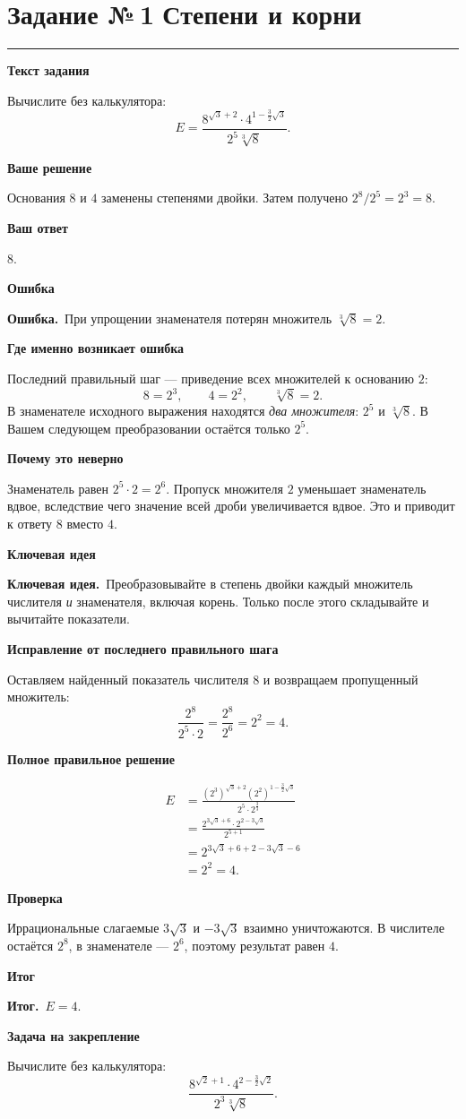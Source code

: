 \documentclass[a4paper,12pt]{article}
\newcommand{\reviewlabel}[1]{\par\smallskip\textbf{\color{accent}#1}\par\nobreak}
\newcommand{\errortext}{\textbf{\color{error}Ошибка.}\ }
\newcommand{\ideatext}{\textbf{\color{hint}Ключевая идея.}\ }
\newcommand{\resulttext}{\textbf{\color{accent}Итог.}\ }
\newcommand{\sep}{\vspace{4pt}\par\noindent\color{rulegray}\rule{\linewidth}{0.35pt}\color{black}\vspace{4pt}}
\newcommand{\tasktitle}[2]{\clearpage\phantomsection\label{task:#1}\section*{Задание №\,#1\,\,\textcolor{accent}{\normalfont\large #2}}\vspace{-3pt}\sep}
\begin{document}
\tasktitle{1}{Степени и корни}
\reviewlabel{Текст задания}
Вычислите без калькулятора:
\[
E=\frac{8^{\sqrt3+2}\cdot4^{1-\frac32\sqrt3}}{2^5\sqrt[3]{8}}.
\]
\reviewlabel{Ваше решение}
Основания $8$ и $4$ заменены степенями двойки. Затем получено $2^8/2^5=2^3=8$.
\reviewlabel{Ваш ответ}
$8$.
\reviewlabel{Ошибка}
\errortext При упрощении знаменателя потерян множитель $\sqrt[3]{8}=2$.
\reviewlabel{Где именно возникает ошибка}
Последний правильный шаг --- приведение всех множителей к основанию $2$:
\[
8=2^3,\qquad4=2^2,\qquad\sqrt[3]{8}=2.
\]
В знаменателе исходного выражения находятся \emph{два множителя}: $2^5$ и $\sqrt[3]{8}$. В Вашем следующем преобразовании остаётся только $2^5$.
\reviewlabel{Почему это неверно}
Знаменатель равен $2^5\cdot2=2^6$. Пропуск множителя $2$ уменьшает знаменатель вдвое, вследствие чего значение всей дроби увеличивается вдвое. Это и приводит к ответу $8$ вместо $4$.
\reviewlabel{Ключевая идея}
\ideatext Преобразовывайте в степень двойки каждый множитель числителя \emph{и} знаменателя, включая корень. Только после этого складывайте и вычитайте показатели.
\reviewlabel{Исправление от последнего правильного шага}
Оставляем найденный показатель числителя $8$ и возвращаем пропущенный множитель:
\[
\frac{2^8}{2^5\cdot\boxed{2}}=\frac{2^8}{2^6}=2^2=4.
\]
\reviewlabel{Полное правильное решение}
\begin{align*}
E&=\frac{(2^3)^{\sqrt3+2}(2^2)^{1-\frac32\sqrt3}}{2^5\cdot2^{\frac33}}\\[2pt]
&=\frac{2^{3\sqrt3+6}\cdot2^{2-3\sqrt3}}{2^{5+1}}\\[2pt]
&=2^{3\sqrt3+6+2-3\sqrt3-6}\\[2pt]
&=2^2=4.
\end{align*}
\reviewlabel{Проверка}
Иррациональные слагаемые $3\sqrt3$ и $-3\sqrt3$ взаимно уничтожаются. В числителе остаётся $2^8$, в знаменателе --- $2^6$, поэтому результат равен $4$.
\reviewlabel{Итог}
\resulttext $\boxed{E=4}$.
\reviewlabel{Задача на закрепление}
Вычислите без калькулятора:
\[
\frac{8^{\sqrt2+1}\cdot4^{2-\frac32\sqrt2}}{2^3\sqrt[3]{8}}.
\]
\end{document}

